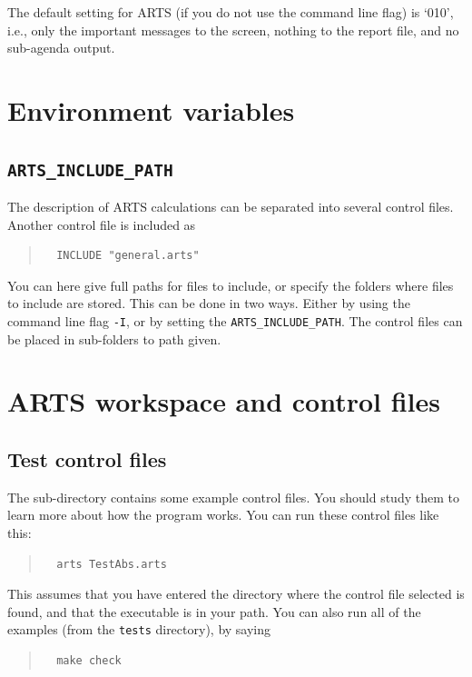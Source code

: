 The default setting for ARTS (if you do not use the command line flag)
is `010', i.e., only the important messages to the screen, nothing to
the report file, and no sub-agenda output.



\section{Environment variables}
\label{sec:concept:envvars}

\subsection*{\texttt{ARTS\_INCLUDE\_PATH}}
%
The description of ARTS calculations can be separated into several
control files. Another control file is included as
\begin{quote}
\begin{verbatim}
  INCLUDE "general.arts"
\end{verbatim}
\end{quote}
You can here give full paths for files to include, or specify the
folders where files to include are stored. This can be done in two
ways. Either by using the command line flag \verb|-I|, or by setting
the  \texttt{ARTS\_INCLUDE\_PATH}. The control
files can be placed in sub-folders to path given.


\section{ARTS workspace and control files}


\subsection{Test control files}
%
The sub-directory  contains some example control files.
You should study them to learn more about how the program works. You
can run these control files like this:
\begin{quote}
\begin{verbatim}
  arts TestAbs.arts
\end{verbatim}
\end{quote}
This assumes that you have entered the directory where the control
file selected is found, and that the  executable is in
your path. You can also run all of the examples (from the \verb|tests|
directory), by saying
\begin{quote}
\begin{verbatim}
  make check
\end{verbatim}
\end{quote}


